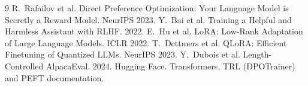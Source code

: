 \documentclass[10pt]{article}
\begin{document}
{\footnotesize
\begin{thebibliography}{9}\setlength{\itemsep}{0pt}
 R.~Rafailov et al. Direct Preference Optimization: Your Language Model is Secretly a Reward Model. NeurIPS 2023.
 Y.~Bai et al. Training a Helpful and Harmless Assistant with RLHF. 2022.
 E.~Hu et al. LoRA: Low-Rank Adaptation of Large Language Models. ICLR 2022.
 T.~Dettmers et al. QLoRA: Efficient Finetuning of Quantized LLMs. NeurIPS 2023.
 Y.~Dubois et al. Length-Controlled AlpacaEval. 2024.
 Hugging Face. Transformers, TRL (DPOTrainer) and PEFT documentation.
\end{thebibliography}}
\end{document}
